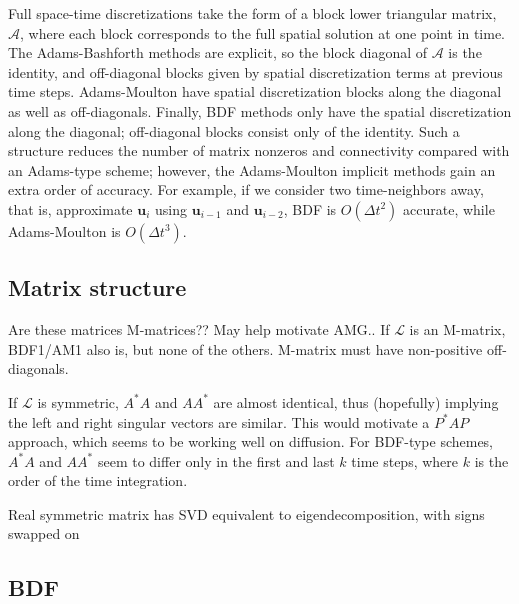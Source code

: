 \documentclass[a4paper,12pt]{article}
\begin{document}
Full space-time discretizations take the form of a block lower triangular matrix, $\mathcal{A}$, where each block corresponds to the full
spatial solution at one point in time. The Adams-Bashforth methods are explicit, so the block diagonal of $\mathcal{A}$ is the identity,
and off-diagonal blocks given by spatial discretization terms at previous time steps. Adams-Moulton have spatial discretization blocks
along the diagonal as well as off-diagonals. Finally, BDF methods only have the spatial discretization along the diagonal; off-diagonal
blocks consist only of the identity. Such a structure reduces the number of matrix nonzeros and connectivity compared with an
Adams-type scheme; however, the Adams-Moulton implicit methods gain an extra order of accuracy. For example, if we consider
two time-neighbors away, that is, approximate $\mathbf{u}_i$ using $\mathbf{u}_{i-1}$ and $\mathbf{u}_{i-2}$, BDF is $O(\Delta t^2)$
accurate, while Adams-Moulton is $O(\Delta t^3)$. 

\subsection{Matrix structure}

Are these matrices M-matrices?? May help motivate AMG.. If $\mathcal{L}$ is an M-matrix, BDF1/AM1 also is, but none of the others.
M-matrix must have non-positive off-diagonals.

If $\mathcal{L}$ is symmetric, $A^*A$ and $AA^*$ are almost identical, thus (hopefully) implying the left and right singular vectors are
similar. This would motivate a $P^*AP$ approach, which seems to be working well on diffusion. For BDF-type schemes, $A^*A$ and $AA^*$
seem to differ only in the first and last $k$ time steps, where $k$ is the order of the time integration.

Real symmetric matrix has SVD equivalent to eigendecomposition, with signs swapped on 


\subsection{BDF}
\end{document}
